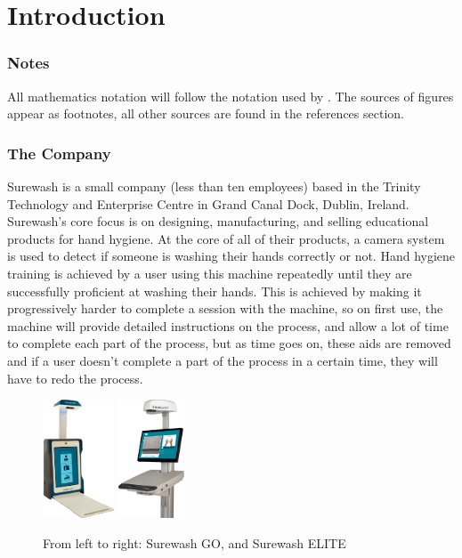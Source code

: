 \part{Introduction}
\section{Notes}
All mathematics notation will follow the notation used by \cite{Goodfellow-et-al-2016}. The sources of figures appear as footnotes, all other sources are found in the references section.
\section{The Company}
Surewash is a small company (less than ten employees) based in the Trinity Technology and Enterprise Centre in Grand Canal Dock, Dublin, Ireland. Surewash's core focus is on designing, manufacturing, and selling educational products for hand hygiene. At the core of all of their products, a camera system is used to detect if someone is washing their hands correctly or not. Hand hygiene training is achieved by a user using this machine repeatedly until they are successfully proficient at washing their hands. This is achieved by making it progressively harder to complete a session with the machine, so on first use, the machine will provide detailed instructions on the process, and allow a lot of time to complete each part of the process, but as time goes on, these aids are removed and if a user doesn't complete a part of the process in a certain time, they will have to redo the process.

\begin{figure}[h]
    \centering
    \includegraphics[height=100pt]{../img/sw_go.png}
    \space \space \space \space \space \space \space \space \space \space \space \space
    \includegraphics[height=100pt]{../img/sw_elite.png}
    \caption[]{From left to right: Surewash GO, and Surewash ELITE\footnotemark}
    \label{fig:sw_elite_go}
\end{figure}

